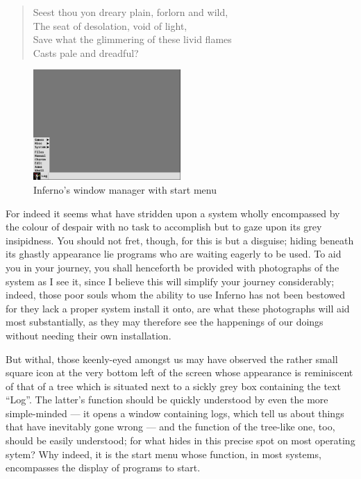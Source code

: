 \documentclass[a5paper,twoside,12pt]{report}
\begin{document}
  \begin{quote}
    Seest thou yon dreary plain, forlorn and wild, \\
    The seat of desolation, void of light, \\
    Save what the glimmering of these livid flames \\
    Casts pale and dreadful?
  \end{quote}

  \begin{figure}
    \centering
    \includegraphics[width=0.5\textwidth]{imgs/start_menu.png}
    \caption{Inferno's window manager with start menu}
  \end{figure}

  For indeed it seems what have stridden upon a system wholly encompassed by the colour of despair with no task to accomplish but to gaze upon its grey insipidness. You should not fret, though, for this is but a disguise; hiding beneath its ghastly appearance lie programs who are waiting eagerly to be used. To aid you in your journey, you shall henceforth be provided with photographs of the system as I see it, since I believe this will simplify your journey considerably; indeed, those poor souls whom the ability to use Inferno has not been bestowed for they lack a proper system install it onto, are what these photographs will aid most substantially, as they may therefore see the happenings of our doings without needing their own installation.

  But withal, those keenly-eyed amongst us may have observed the rather small square icon at the very bottom left of the screen whose appearance is reminiscent of that of a tree which is situated next to a sickly grey box containing the text ``Log''. The latter's function should be quickly understood by even the more simple-minded — it opens a window containing logs, which tell us about things that have inevitably gone wrong — and the function of the tree-like one, too, should be easily understood; for what hides in this precise spot on most operating sytem? Why indeed, it is the start menu whose function, in most systems, encompasses the display of programs to start.
\end{document}

